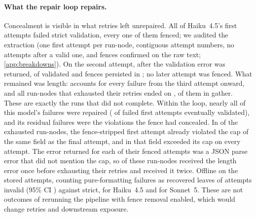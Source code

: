 \paragraph{What the repair loop repairs.}
Concealment is visible in what retries left unrepaired. All
 of Haiku~4.5's first attempts
failed strict validation, every one of them fenced; we audited the
extraction (one first attempt per run-node, contiguous attempt numbers,
no attempts after a valid one, and fences confirmed on the raw text;
\cref{app:breakdowns}). On the second attempt, after the validation error
was returned,  of
 validated and fences persisted in
; no later attempt
was fenced. What remained was length:  accounts for
every failure from the third attempt onward, and all
 run-nodes that exhausted their
retries ended on , 
of them in gather. These are exactly the runs that did not complete. Within the loop, nearly all of this model's failures
were repaired ( of
 failed first attempts eventually
validated), and its residual failures were the violations the fence had concealed. In
 of the  exhausted run-nodes,
the fence-stripped first attempt already violated the cap of the same field
as the final attempt, and in  that field exceeded
its cap on every attempt. The error returned for each of their
 fenced attempts was a JSON parse error that did not
mention the cap, so  of these run-nodes
received the length error once before exhausting their retries and
 received it twice. Offline on the stored attempts, counting pure-formatting
failures as recovered leaves  of
attempts invalid (95\% CI ) against
 strict, 
for Haiku~4.5 and  for
Sonnet~5. These are not outcomes of rerunning the pipeline with fence
removal enabled, which would change retries and downstream exposure.

\begin{table}[!htbp]
\centering\small
\caption{Exploratory prompt ablation on Haiku~4.5, HotpotQA, rates over
attempts. The last row counts length violations that are primary or
concealed beneath a fence. Design limits are given in
\cref{sec:results:concealment}.}
\label{tab:ablation}

\end{table}

